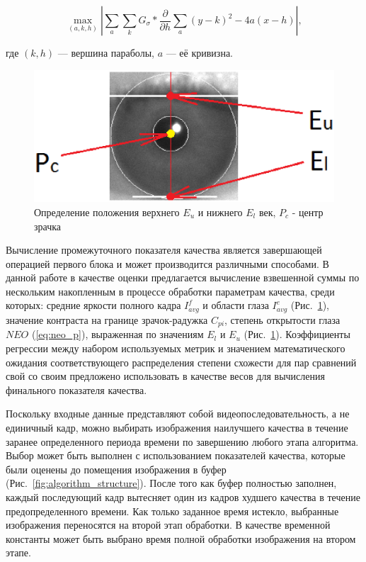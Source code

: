 \begin{equation}\label{eq:daugman_ido_parabolic}
\max \limits_{(a,k,h)} \left |\sum_{a}\sum_{k} G_\sigma * 
{\frac{\partial}{\partial h} \sum_{a} (y-k)^2-4a(x-h)} \right |,
\end{equation}

\noindent
где $(k, h)$ — вершина параболы, $a$ — её кривизна.

\begin{figure}[!h]
	\centering
	\includegraphics[width=0.5\columnwidth]{pictures/eyelid_position_pointers.eps}
	\caption{Определение положения верхнего $E_u$ и нижнего $E_l$ век, $P_c$ - центр зрачка}
	\label{fig:eyelid_position}
\end{figure}

\noindent
Вычисление промежуточного показателя качества является завершающей операцией первого блока и может производится различными способами. В данной работе в качестве оценки предлагается вычисление взвешенной суммы по нескольким накопленным в процессе обработки параметрам качества, среди которых: средние яркости полного кадра $I_{avg}^f$ и области глаза $I_{avg}^e$ (Рис.~\ref{fig:eyelid_position}), значение контраста на границе зрачок-радужка $C_{pi}$, степень открытости глаза $NEO$ (\ref{eq:neo_p}), выраженная по значениям $E_l$ и $E_u$ (Рис.~\ref{fig:eyelid_position}). Коэффициенты регрессии между набором используемых метрик и значением математического ожидания соответствующего распределения степени схожести для пар сравнений свой со своим предложено использовать в качестве весов для вычисления финального показателя качества.

Поскольку входные данные представляют собой видеопоследовательность, а не единичный кадр, можно выбирать изображения наилучшего качества в течение заранее определенного периода времени по завершению любого этапа алгоритма. Выбор может быть выполнен с использованием показателей качества, которые были оценены до помещения изображения в буфер (Рис.~\ref{fig:algorithm_structure}). После того как буфер полностью заполнен, каждый последующий кадр вытесняет один из кадров худшего качества в течение предопределенного времени. Как только заданное время истекло, выбранные изображения переносятся на второй этап обработки. В качестве временной константы может быть выбрано время полной обработки изображения на втором этапе.

